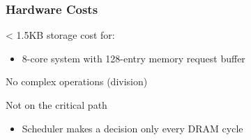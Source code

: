 \documentclass[]{article}
\providecommand{\tightlist}{%
  \setlength{\itemsep}{0pt}\setlength{\parskip}{0pt}}
\begin{document}
\hypertarget{hardware-costs}{%
\subsubsection{Hardware Costs}\label{hardware-costs}}

\textless{} 1.5KB storage cost for:

\begin{itemize}
\tightlist
\item
  8-core system with 128-entry memory request buffer
\end{itemize}

No complex operations (division)

Not on the critical path

\begin{itemize}
\tightlist
\item
  Scheduler makes a decision only every DRAM cycle
\end{itemize}
\end{document}
